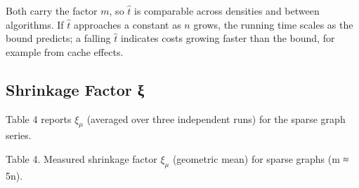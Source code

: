 \documentclass[11pt]{article}
\theoremstyle{plain}
\theoremstyle{remark}
\begin{document}
Both carry the factor \(m\), so \(\widehat{t}\) is comparable across
densities and between algorithms. If \(\widehat{t}\) approaches a
constant as \(n\) grows, the running time scales as the bound predicts;
a falling \(\widehat{t}\) indicates costs growing faster than the bound,
for example from cache effects.


\subsection{Shrinkage Factor ξ}

Table 4 reports \(\xi_{\mu}\) (averaged over three independent runs) for
the sparse graph series.

Table 4. Measured shrinkage factor \(\xi_{\mu}\) (geometric mean) for
sparse graphs (m ≈ 5n).
\end{document}
